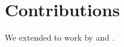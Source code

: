 \section{Contributions}
\label{sec:one:contributions}

We extended to work by \cite{HMS12SequentialWeightCounter} and \cite{Bjork11Encodings}.